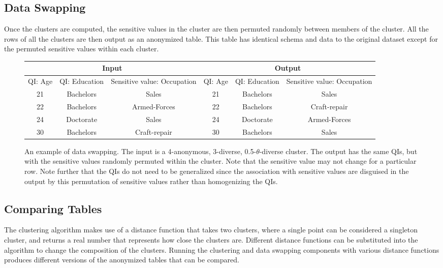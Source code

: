 \subsection{Data Swapping}
Once the clusters are computed, the sensitive values in the cluster are then permuted randomly between members of the cluster. All the rows of all the clusters are then output as an anonymized table. This table has identical schema and data to the original dataset except for the permuted sensitive values within each cluster.

\begin{figure*}
\centering
\begin{tabular}{|c|c|c||c|c|c|}
\hline
\multicolumn{3}{|c|}{Input} & \multicolumn{3}{|c|}{Output}  \\
\hline
QI: Age & QI: Education & Sensitive value: Occupation & QI: Age & QI: Education & Sensitive value: Occupation \\
\hline
\hline
21 & Bachelors & Sales & 21 & Bachelors & Sales \\
\hline
22 & Bachelors & Armed-Forces & 22 & Bachelors & Craft-repair  \\
\hline
24 & Doctorate & Sales & 24 & Doctorate & Armed-Forces  \\
\hline
30 & Bachelors & Craft-repair & 30 & Bachelors & Sales  \\
\hline
\end{tabular}
\caption{An example of data swapping. The input is a 4-anonymous, 3-diverse, 0.5-$\theta$-diverse cluster. The output has the same QIs, but with the sensitive values randomly permuted within the cluster. Note that the sensitive value may not change for a particular row. Note further that the QIs do not need to be generalized since the association with sensitive values are disguised in the output by this permutation of sensitive values rather than homogenizing the QIs.}
\label{fig:dataSwapping}
\end{figure*}

\subsection{Comparing Tables}
The clustering algorithm makes use of a distance function that takes two clusters, where a single point can be considered a singleton cluster, and returns a real number that represents how close the clusters are. Different distance functions can be substituted into the algorithm to change the composition of the clusters. Running the clustering and data swapping components with various distance functions produces different versions of the anonymized tables that can be compared.

